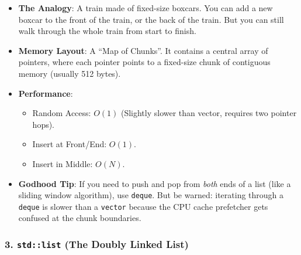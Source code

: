 \begin{itemize}
\tightlist
\item
  \textbf{The Analogy}: A train made of fixed-size boxcars. You can add
  a new boxcar to the front of the train, or the back of the train. But
  you can still walk through the whole train from start to finish.
\item
  \textbf{Memory Layout}: A ``Map of Chunks''. It contains a central
  array of pointers, where each pointer points to a fixed-size chunk of
  contiguous memory (usually 512 bytes).
\item
  \textbf{Performance}:

  \begin{itemize}
  \tightlist
  \item
    Random Access: \(O(1)\) (Slightly slower than vector, requires two
    pointer hops).
  \item
    Insert at Front/End: \(O(1)\).
  \item
    Insert in Middle: \(O(N)\).
  \end{itemize}
\item
  \textbf{Godhood Tip}: If you need to push and pop from \emph{both}
  ends of a list (like a sliding window algorithm), use
  \passthrough{\lstinline!deque!}. But be warned: iterating through a
  \passthrough{\lstinline!deque!} is slower than a
  \passthrough{\lstinline!vector!} because the CPU cache prefetcher gets
  confused at the chunk boundaries.
\end{itemize}

\hypertarget{stdlist-the-doubly-linked-list}{%
\subsubsection{\texorpdfstring{3. \texttt{std::list} (The Doubly Linked
List)}{3. std::list (The Doubly Linked List)}}\label{stdlist-the-doubly-linked-list}}


